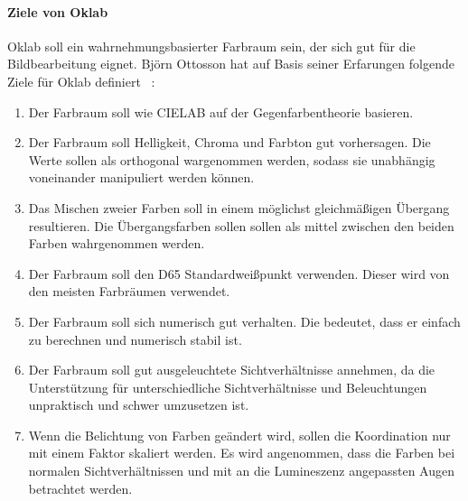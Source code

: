 \documentclass[12pt, a4paper, ngerman]{article}
\begin{document}
\paragraph{Ziele von Oklab}
Oklab soll ein wahrnehmungsbasierter Farbraum sein, der sich gut für die Bildbearbeitung eignet.
Björn Ottosson hat auf Basis seiner Erfarungen folgende Ziele für Oklab definiert ~\cite{Oklab_2020}:
\begin{enumerate}
  \item Der Farbraum soll wie CIELAB auf der Gegenfarbentheorie basieren.
  \item Der Farbraum soll Helligkeit, Chroma und Farbton gut vorhersagen. Die Werte sollen als orthogonal wargenommen werden, sodass sie unabhängig voneinander manipuliert werden können.
  \item Das Mischen zweier Farben soll in einem möglichst gleichmäßigen Übergang resultieren. Die Übergangsfarben sollen sollen als mittel zwischen den beiden Farben wahrgenommen werden. 
  \item Der Farbraum soll den D65 Standardweißpunkt verwenden. Dieser wird von den meisten Farbräumen verwendet.
  \item Der Farbraum soll sich numerisch gut verhalten. Die bedeutet, dass er einfach zu berechnen und numerisch stabil ist.
  \item Der Farbraum soll gut ausgeleuchtete Sichtverhältnisse annehmen, da die Unterstützung für unterschiedliche Sichtverhältnisse und Beleuchtungen unpraktisch und schwer umzusetzen ist.
  \item Wenn die Belichtung von Farben geändert wird, sollen die Koordination nur mit einem Faktor skaliert werden. Es wird angenommen, dass die Farben bei normalen Sichtverhältnissen und mit an die Lumineszenz angepassten Augen betrachtet werden.
\end{enumerate}
\end{document}
